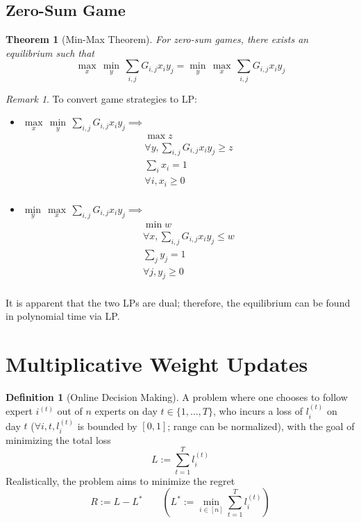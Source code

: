 \documentclass[11pt]{article}
\newtheorem{theorem}{Theorem}[section]
\theoremstyle{definition}
\newtheorem{definition}{Definition}[section]
\theoremstyle{remark}
\newtheorem*{remark}{Remark}
\begin{document}
\subsection{Zero-Sum Game}
\begin{theorem}[Min-Max Theorem] For zero-sum games, there exists an equilibrium such that
\[\underset{x}{\max}\, \underset{y}{\min}\, \sum_{i,j}G_{i,j}x_i y_j = \underset{y}{\min}\,\underset{x}{\max}\,  \sum_{i,j}G_{i,j}x_i y_j\]
\end{theorem}
\begin{remark}
To convert game strategies to LP:
\begin{itemize}
\item $\underset{x}{\max}\, \underset{y}{\min}\, \sum_{i,j}G_{i,j}x_i y_j \implies$
\begin{align*}
\max z \\
\forall y, \sum_{i,j}G_{i,j}x_i y_j \geq z \\
\sum_i x_i = 1 \\
\forall i, x_i \geq 0 \\
\end{align*}

\item $\underset{y}{\min}\,\underset{x}{\max}\,  \sum_{i,j}G_{i,j}x_i y_j \implies$
\begin{align*}
\min w \\
\forall x, \sum_{i,j}G_{i,j}x_i y_j \leq w \\
\sum_j y_j = 1 \\
\forall j, y_j \geq 0 \\
\end{align*}
\end{itemize}
It is apparent that the two LPs are dual; therefore, the equilibrium can be found in polynomial time via LP.
\end{remark}
\clearpage

\section{Multiplicative Weight Updates}
\begin{definition}[Online Decision Making]
A problem where one chooses to follow expert $i^{(t)}$ out of $n$ experts on day $t \in \{1,\dots,T\}$, who incurs a loss of $l_i^{(t)}$ on day $t$ ($\forall i, t, l_i^{(t)}$ is bounded by $[0,1]$; range can be normalized), with the goal of minimizing the total loss 
\[L := \sum_{t=1}^T l_i ^{(t)}\]
Realistically, the problem aims to minimize the regret
\[R := L - L^* \qquad \left(  L^* := \min_{i\in [n]} \sum_{t=1}^T l_i^{(t)}    \right)\]
\end{definition}
\end{document}
